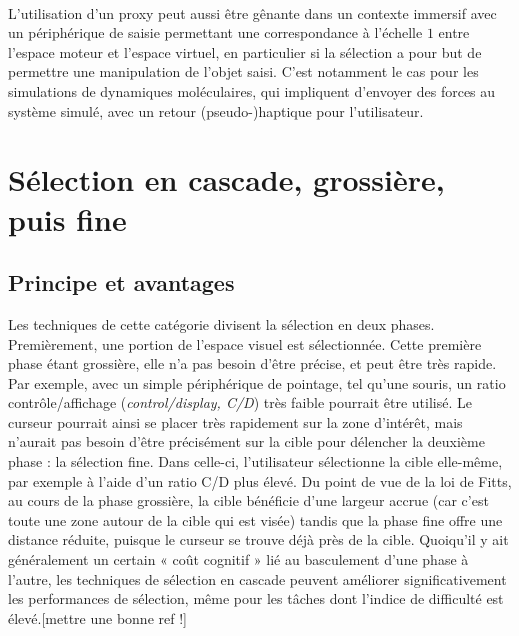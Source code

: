 	\paragraph{}
	L'utilisation d'un proxy peut aussi être gênante dans un contexte immersif avec un périphérique de saisie permettant une correspondance à l'échelle $1$ entre l'espace moteur et l'espace virtuel, en particulier si la sélection a pour but de permettre une manipulation de l'objet saisi. C'est notamment le cas pour les simulations de dynamiques moléculaires, qui impliquent d'envoyer des forces au système simulé, avec un retour (pseudo-)haptique pour l'utilisateur.
		

\section{Sélection en cascade, grossière, puis fine}
	 \subsection{Principe et avantages}
	 Les techniques de cette catégorie divisent la sélection en deux phases. Premièrement, une portion de l'espace visuel est sélectionnée. Cette première phase étant grossière, elle n'a pas besoin d'être précise, et peut être très rapide. Par exemple, avec un simple périphérique de pointage, tel qu'une souris, un ratio contrôle/affichage (\emph{control/display, C/D}) très faible pourrait être utilisé. Le curseur pourrait ainsi se placer très rapidement sur la zone d'intérêt, mais n'aurait pas besoin d'être précisément sur la cible pour délencher la deuxième phase : la sélection fine. Dans celle-ci, l'utilisateur sélectionne la cible elle-même, par exemple à l'aide d'un ratio C/D plus élevé. Du point de vue de la loi de Fitts, au cours de la phase grossière, la cible bénéficie d'une largeur accrue (car c'est toute une zone autour de la cible qui est visée) tandis que la phase fine offre une distance réduite, puisque le curseur se trouve déjà près de la cible. Quoiqu'il y ait généralement un certain « coût cognitif » lié au basculement d'une phase à l'autre, les techniques de sélection en cascade peuvent améliorer significativement les performances de sélection, même pour les tâches dont l'indice de difficulté est élevé.[mettre une bonne ref !]
		 
